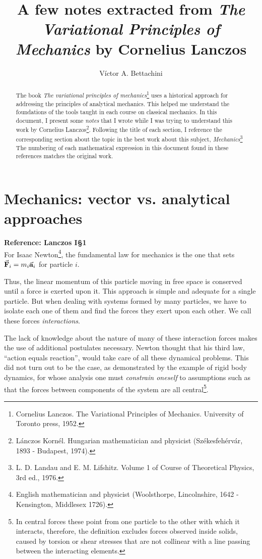 \documentclass[12pt, spanish, a4paper, ]{article}
\title{A few notes extracted from \emph{The Variational Principles of Mechanics} by Cornelius Lanczos}
\author{Víctor A. Bettachini}
\date{}
\begin{document}
\maketitle

\begin{abstract}
    The book \emph{The variational principles of mechanics}\footnote{Cornelius Lanczos. The Variational Principles of Mechanics. University of Toronto press, 1952.
    } uses a historical approach for addressing the principles of analytical mechanics.
    This helped me understand the foundations of the tools taught in each course on classical mechanics.
    In this document, I present some \emph{notes} that I wrote while I was trying to understand this work by Cornelius Lanczos\footnote{Lánczos Kornél. Hungarian mathematician and physicist (Székesfehérvár, 1893 - Budapest, 1974).}.
    Following the title of each section, I reference the corresponding section about the topic in the best work about this subject, \emph{Mechanics}\footnote{L. D. Landau and E. M. Lifshitz. Volume 1 of Course of Theoretical Physics, 3rd ed., 1976.} The numbering of each mathematical expression in this document found in these references matches the original work.
\end{abstract}


\tableofcontents

\section{Mechanics: vector vs. analytical approaches}
\textbf{Reference: Lanczos I\S1}\\

For Isaac Newton\footnote{English mathematician and physicist (Woolsthorpe, Lincolnshire, 1642 - Kensington, Middlesex 1726).}, the fundamental law for mechanics is the one that sets \(\va{F}_i= m_i \va{a}_i\) for particle \(i\).

Thus, the linear momentum of this particle moving in free space is conserved until a force is exerted upon it. This approach is simple and adequate for a single particle.
But when dealing with systems formed by many particles, we have to isolate each one of them and find the forces they exert upon each other. We call these forces \emph{interactions}.

The lack of knowledge about the nature of many of these interaction forces makes the use of additional postulates necessary.
Newton thought that his third law, ``action equals reaction'', would take care of all these dynamical problems.
This did not turn out to be the case, as demonstrated by the example of rigid body dynamics, for whose analysis one must \emph{constrain oneself} to assumptions such as that the forces between components of the system are all central\footnote{In central forces these point from one particle to the other with which it interacts, therefore, the definition excludes forces observed inside solids, caused by torsion or shear stresses that are not collinear with a line passing between the interacting elements.}.
\end{document}
